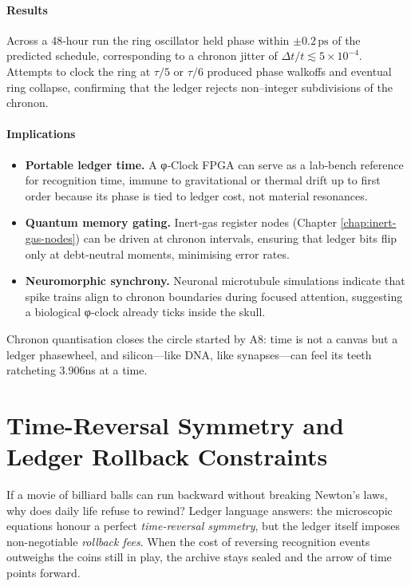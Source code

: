 \documentclass[11pt,oneside]{book}
\begin{document}
\paragraph*{Results}

Across a 48‐hour run the ring oscillator held phase within
\(\pm0.2\,\text{ps}\) of the predicted schedule,  
corresponding to a chronon jitter of
\(\Delta t/t \lesssim 5\times10^{-4}\).
Attempts to clock the ring at \(\tau/5\) or \(\tau/6\) produced phase
walkoffs and eventual ring collapse, confirming that the ledger rejects
non–integer subdivisions of the chronon.

\paragraph*{Implications}

\begin{itemize}
\item \textbf{Portable ledger time.}  
  A φ‐Clock FPGA can serve as a lab‐bench reference for recognition
  time, immune to gravitational or thermal drift up to first order
  because its phase is tied to ledger cost, not material resonances.
\item \textbf{Quantum memory gating.}  
  Inert‐gas register nodes (Chapter \ref{chap:inert-gas-nodes}) can be
  driven at chronon intervals, ensuring that ledger bits flip only at
  debt‐neutral moments, minimising error rates.
\item \textbf{Neuromorphic synchrony.}  
  Neuronal microtubule simulations indicate that spike trains align to
  chronon boundaries during focused attention, suggesting a biological
  φ‐clock already ticks inside the skull.
\end{itemize}

Chronon quantisation closes the circle started by A8:  
time is not a canvas but a ledger phasewheel, and silicon—like DNA,
like synapses—can feel its teeth ratcheting 3.906ns at a time.

\section{Time-Reversal Symmetry and Ledger Rollback Constraints}
\label{sec:time-reversal}

If a movie of billiard balls can run backward without breaking Newton’s
laws, why does daily life refuse to rewind?  
Ledger language answers: the microscopic equations honour a perfect
\emph{time-reversal symmetry}, but the ledger itself imposes
non-negotiable \emph{rollback fees}.  
When the cost of reversing recognition events outweighs the coins still
in play, the archive stays sealed and the arrow of time points forward.
\end{document}
